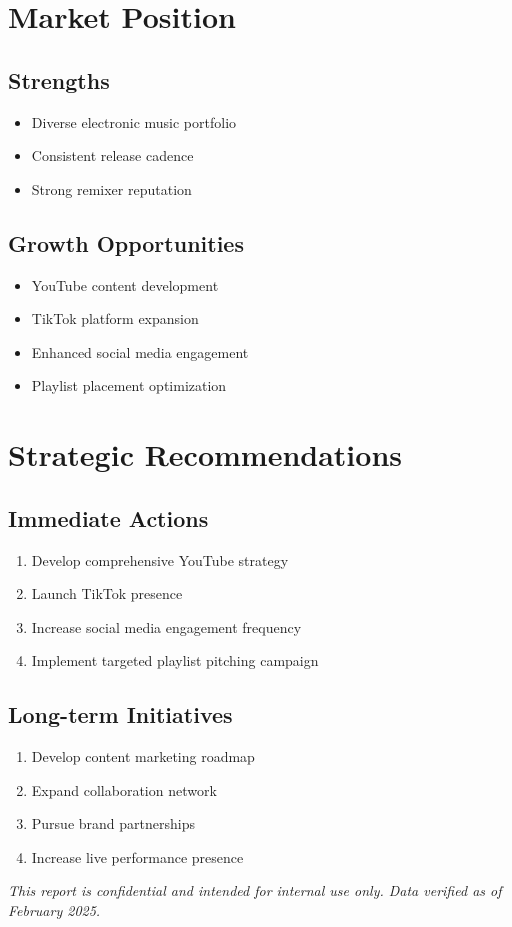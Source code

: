\documentclass{article}
\begin{document}
\section*{Market Position}

\subsection*{Strengths}
\begin{itemize}
\item Diverse electronic music portfolio
\item Consistent release cadence
\item Strong remixer reputation
\end{itemize}

\subsection*{Growth Opportunities}
\begin{itemize}
\item YouTube content development
\item TikTok platform expansion
\item Enhanced social media engagement
\item Playlist placement optimization
\end{itemize}

\section*{Strategic Recommendations}

\subsection*{Immediate Actions}
\begin{enumerate}
\item Develop comprehensive YouTube strategy
\item Launch TikTok presence
\item Increase social media engagement frequency
\item Implement targeted playlist pitching campaign
\end{enumerate}

\subsection*{Long-term Initiatives}
\begin{enumerate}
\item Develop content marketing roadmap
\item Expand collaboration network
\item Pursue brand partnerships
\item Increase live performance presence
\end{enumerate}

\vspace{0.5cm}
\textit{This report is confidential and intended for internal use only. Data verified as of February 2025.}
\end{document}
